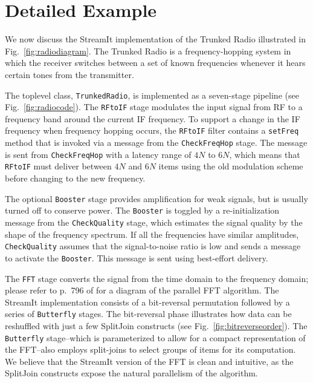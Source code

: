 \section{Detailed Example}
\label{sec:example}

We now discuss the StreamIt implementation of the Trunked Radio
illustrated in Fig.~\ref{fig:radiodiagram}.  The Trunked Radio is a
frequency-hopping system in which the receiver switches between a set of
known frequencies whenever it hears certain tones from the transmitter.

The toplevel class, \texttt{TrunkedRadio}, is implemented as a
seven-stage pipeline (see Fig.~\ref{fig:radiocode}).  The
\texttt{RFtoIF} stage modulates the input signal from RF to a
frequency band around the current IF frequency.  To support a change
in the IF frequency when frequency hopping occurs, the \texttt{RFtoIF}
filter contains a \texttt{setFreq} method that is invoked via a
message from the \texttt{CheckFreqHop} stage.  The message is sent
from \texttt{CheckFreqHop} with a latency range of $4N$ to $6N$, which
means that \texttt{RFtoIF} must deliver between $4N$ and $6N$ items
using the old modulation scheme before changing to the new frequency.

The optional \texttt{Booster} stage provides amplification for weak
signals, but is usually turned off to conserve power.  The
\texttt{Booster} is toggled by a re-initialization message from the
\texttt{CheckQuality} stage, which estimates the signal quality by the
shape of the frequency spectrum.  If all the frequencies have similar
amplitudes, \texttt{CheckQuality} assumes that the signal-to-noise
ratio is low and sends a message to activate the \texttt{Booster}.
This message is sent using best-effort delivery.

The \texttt{FFT} stage converts the signal from the time domain to the
frequency domain; please refer to p.~796 of \cite{clr} for a diagram
of the parallel FFT algorithm.  The StreamIt implementation consists
of a bit-reversal permutation followed by a series of
\texttt{Butterfly} stages.  The bit-reversal phase illustrates how
data can be reshuffled with just a few SplitJoin constructs (see
Fig.~\ref{fig:bitreverseorder}).  The \texttt{Butterfly}
stage--which is parameterized to allow for a compact representation of
the FFT--also employs split-joins to select groups of items for its
computation.  We believe that the StreamIt version of the FFT is clean
and intuitive, as the SplitJoin constructs expose the natural
parallelism of the algorithm.

